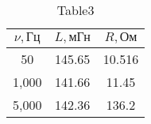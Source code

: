 \begin{table} 
 \caption{Table3}
\begin{tabular}{|*{3}{c|}}
\hline 
$\nu, \text{Гц}$ & $L, \text{мГн}$ & $R, \text{Ом}$\\ \hline 
50 & 145.65 & 10.516 \\ \hline 
 1,000 & 141.66 & 11.45 \\ \hline 
 5,000 & 142.36 & 136.2 \\ \hline 
 \end{tabular} 
\end{table} 
